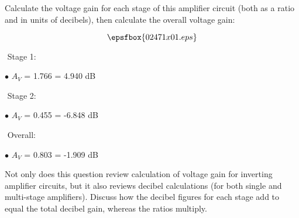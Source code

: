 

Calculate the voltage gain for each stage of this amplifier circuit (both as a ratio and in units of decibels), then calculate the overall voltage gain:

$$\epsfbox{02471x01.eps}$$







\medskip
\goodbreak
\item{$ $} Stage 1:
\item{$\bullet$} $A_V$ = 1.766 = 4.940 dB
\medskip

\medskip
\goodbreak
\item{$ $} Stage 2:
\item{$\bullet$} $A_V$ = 0.455 = -6.848 dB
\medskip

\medskip
\goodbreak
\item{$ $} Overall:
\item{$\bullet$} $A_V$ = 0.803 = -1.909 dB
\medskip







Not only does this question review calculation of voltage gain for inverting amplifier circuits, but it also reviews decibel calculations (for both single and multi-stage amplifiers).  Discuss how the decibel figures for each stage add to equal the total decibel gain, whereas the ratios multiply.




